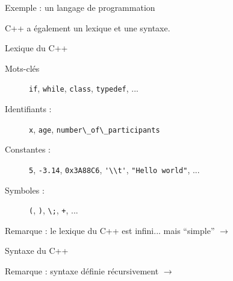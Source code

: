 
\begingroup

\begin{frame}{Exemple : un langage de programmation}

  C++ a également un lexique et une syntaxe.
  \begin{block}{Lexique du C++}
    \begin{description}
    \item[Mots-clés] \lstinline{if}, \lstinline{while}, \lstinline{class}, \lstinline{typedef}, ...
    \item[Identifiants :] \lstinline{x}, \lstinline{age}, \lstinline{number\_of\_participants}
    \item[Constantes :] \lstinline{5}, \lstinline{-3.14}, \lstinline{0x3A88C6}, \lstinline{'\\t'}, \lstinline{"Hello world"}, ...
    \item[Symboles :] \lstinline{(}, \lstinline{)}, \lstinline{\;}, \lstinline{+}, ...
    \end{description}
    \alert{Remarque :} le lexique du C++ est infini... mais ``simple'' $\rightarrow$ 
  \end{block}
  
  \begin{block}{Syntaxe du C++}
    \alert{Remarque :} syntaxe définie récursivement $\rightarrow$ 
  \end{block}

\end{frame}

\endgroup
